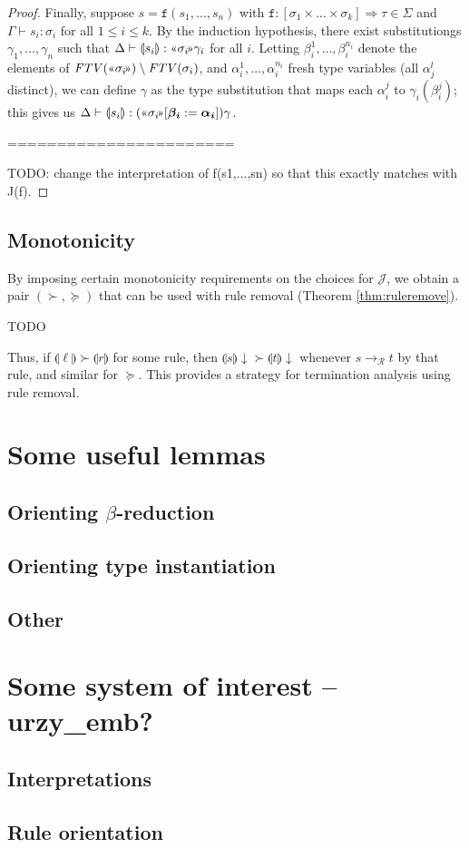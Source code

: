 \documentclass[runningheads,a4paper]{llncs}
\newcommand{\Rules}{\mathcal{R}}
\newcommand{\Termmap}{\mathcal{J}}
\newcommand{\typeinterpret}[1]{\text{\guillemotleft} #1\! \text{\guillemotright}}
\newcommand{\interpret}[1]{\llparenthesis #1 \rrparenthesis}
\newcommand{\arr}[1]{\to_{#1}}
\newcommand{\arrtype}{\Rightarrow}
\newcommand{\FTV}{\mathit{FTV}}
\begin{document}
\begin{proof}
Finally, suppose $s = \mathtt{f}(s_1,\dots,s_n)$ with $\mathtt{f} :
[\sigma_1 \times \dots \times \sigma_k] \arrtype \tau \in \Sigma$ and
$\Gamma \vdash s_i : \sigma_i$ for all $1 \leq i \leq k$.  By the
induction hypothesis, there exist substitutiongs $\gamma_1,\dots,
\gamma_n$ such that $\Delta \vdash \interpret{s_i} : \typeinterpret{
\sigma_i}\gamma_i$ for all $i$.  Letting $\beta_i^1,\dots,\beta_i^{n_i}$
denote the elements of $\FTV(\typeinterpret{\sigma_i}) \setminus \FTV(
\sigma_i)$, and $\alpha_i^1,\dots,\alpha_i^{n_i}$ fresh type variables
(all $\alpha_j^l$ distinct), we can define $\gamma$ as the type
substitution that maps each $\alpha_i^j$ to $\gamma_i(\beta_i^j)$;
this gives us $\Delta \vdash \interpret{s_i} : (\typeinterpret{\sigma_i}
[\vec{\beta_i}:=\vec{\alpha_i}])\gamma$.

=======================

TODO: change the interpretation of f(s1,...,sn) so that this exactly
matches with J(f).

\end{proof}

\subsection{Monotonicity}

By imposing certain monotonicity requirements on the choices for
$\Termmap$, we obtain a pair $(\succ,\succeq)$ that can be used with
rule removal (Theorem \ref{thm:ruleremove}).

\begin{lemma}
TODO
\end{lemma}

Thus, if $\interpret{\ell} \succ \interpret{r}$ for some rule, then
$\interpret{s}\downarrow \succ \interpret{t}\downarrow$ whenever
$s \arr{\Rules} t$ by that rule, and similar for $\succeq$.  This
provides a strategy for termination analysis using rule removal.

\section{Some useful lemmas}

\subsection{Orienting $\beta$-reduction}

\subsection{Orienting type instantiation}

\subsection{Other}

\section{Some system of interest -- urzy\_emb?}

\subsection{Interpretations}

\subsection{Rule orientation}
\end{document}
